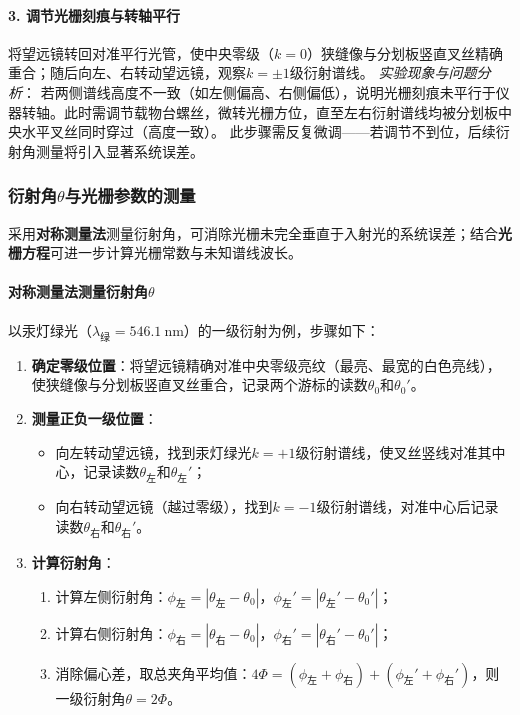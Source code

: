 \documentclass[11pt]{article}
\begin{document}
\paragraph{3. 调节光栅刻痕与转轴平行}
将望远镜转回对准平行光管，使中央零级（\( k=0 \)）狭缝像与分划板竖直叉丝精确重合；随后向左、右转动望远镜，观察\( k=\pm1 \)级衍射谱线。
\textit{实验现象与问题分析}：
若两侧谱线高度不一致（如左侧偏高、右侧偏低），说明光栅刻痕未平行于仪器转轴。此时需调节载物台螺丝，微转光栅方位，直至左右衍射谱线均被分划板中央水平叉丝同时穿过（高度一致）。
此步骤需反复微调——若调节不到位，后续衍射角测量将引入显著系统误差。


\subsubsection{衍射角\(\theta\)与光栅参数的测量}
采用\textbf{对称测量法}测量衍射角，可消除光栅未完全垂直于入射光的系统误差；结合\textbf{光栅方程}可进一步计算光栅常数与未知谱线波长。

\paragraph{对称测量法测量衍射角\(\theta\)}
以汞灯绿光（\( \lambda_{\text{绿}} = 546.1\ \text{nm} \)）的一级衍射为例，步骤如下：

\begin{enumerate}[itemsep=0.5ex]
    \item \textbf{确定零级位置}：将望远镜精确对准中央零级亮纹（最亮、最宽的白色亮线），使狭缝像与分划板竖直叉丝重合，记录两个游标的读数\( \theta_0 \)和\( \theta_0' \)。
    
    \item \textbf{测量正负一级位置}：
        \begin{itemize}
            \item 向左转动望远镜，找到汞灯绿光\( k=+1 \)级衍射谱线，使叉丝竖线对准其中心，记录读数\( \theta_{\text{左}} \)和\( \theta_{\text{左}}' \)；
            \item 向右转动望远镜（越过零级），找到\( k=-1 \)级衍射谱线，对准中心后记录读数\( \theta_{\text{右}} \)和\( \theta_{\text{右}}' \)。
        \end{itemize}
    
    \item \textbf{计算衍射角}：
        \begin{enumerate}[label=\roman*.]
            \item 计算左侧衍射角：\( \phi_{\text{左}} = |\theta_{\text{左}} - \theta_0| \)，\( \phi_{\text{左}}' = |\theta_{\text{左}}' - \theta_0'| \)；
            \item 计算右侧衍射角：\( \phi_{\text{右}} = |\theta_{\text{右}} - \theta_0| \)，\( \phi_{\text{右}}' = |\theta_{\text{右}}' - \theta_0'| \)；
            \item 消除偏心差，取总夹角平均值：\( 4\Phi = (\phi_{\text{左}} + \phi_{\text{右}}) + (\phi_{\text{左}}' + \phi_{\text{右}}') \)，则一级衍射角\( \theta = 2\Phi \)。
        \end{enumerate}
\end{enumerate}
\end{document}

